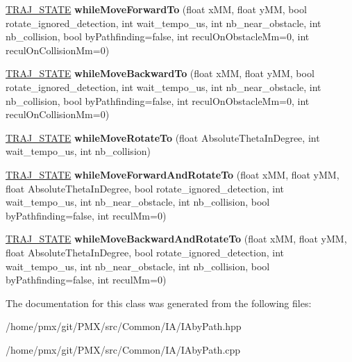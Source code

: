 \begin{DoxyCompactItemize}
\item 
\mbox{\label{classIAbyPath_a835177193bbd053e7901405bbd486401}} 
\hyperlink{path__manager_8h_adb3360abeb29758da93865c8afcb80eb}{T\+R\+A\+J\+\_\+\+S\+T\+A\+TE} {\bfseries while\+Move\+Forward\+To} (float x\+MM, float y\+MM, bool rotate\+\_\+ignored\+\_\+detection, int wait\+\_\+tempo\+\_\+us, int nb\+\_\+near\+\_\+obstacle, int nb\+\_\+collision, bool by\+Pathfinding=false, int recul\+On\+Obstacle\+Mm=0, int recul\+On\+Collision\+Mm=0)
\item 
\mbox{\label{classIAbyPath_acc586e1ba62ffb7a21087a5ca4d2f131}} 
\hyperlink{path__manager_8h_adb3360abeb29758da93865c8afcb80eb}{T\+R\+A\+J\+\_\+\+S\+T\+A\+TE} {\bfseries while\+Move\+Backward\+To} (float x\+MM, float y\+MM, bool rotate\+\_\+ignored\+\_\+detection, int wait\+\_\+tempo\+\_\+us, int nb\+\_\+near\+\_\+obstacle, int nb\+\_\+collision, bool by\+Pathfinding=false, int recul\+On\+Obstacle\+Mm=0, int recul\+On\+Collision\+Mm=0)
\item 
\mbox{\label{classIAbyPath_a42570f6bc87216c2ac5d028ad596fe02}} 
\hyperlink{path__manager_8h_adb3360abeb29758da93865c8afcb80eb}{T\+R\+A\+J\+\_\+\+S\+T\+A\+TE} {\bfseries while\+Move\+Rotate\+To} (float Absolute\+Theta\+In\+Degree, int wait\+\_\+tempo\+\_\+us, int nb\+\_\+collision)
\item 
\mbox{\label{classIAbyPath_ad4bfc042f043aa802567f05604fb37ad}} 
\hyperlink{path__manager_8h_adb3360abeb29758da93865c8afcb80eb}{T\+R\+A\+J\+\_\+\+S\+T\+A\+TE} {\bfseries while\+Move\+Forward\+And\+Rotate\+To} (float x\+MM, float y\+MM, float Absolute\+Theta\+In\+Degree, bool rotate\+\_\+ignored\+\_\+detection, int wait\+\_\+tempo\+\_\+us, int nb\+\_\+near\+\_\+obstacle, int nb\+\_\+collision, bool by\+Pathfinding=false, int recul\+Mm=0)
\item 
\mbox{\label{classIAbyPath_a9535c82f137778cc6cd4b159fe3d58ea}} 
\hyperlink{path__manager_8h_adb3360abeb29758da93865c8afcb80eb}{T\+R\+A\+J\+\_\+\+S\+T\+A\+TE} {\bfseries while\+Move\+Backward\+And\+Rotate\+To} (float x\+MM, float y\+MM, float Absolute\+Theta\+In\+Degree, bool rotate\+\_\+ignored\+\_\+detection, int wait\+\_\+tempo\+\_\+us, int nb\+\_\+near\+\_\+obstacle, int nb\+\_\+collision, bool by\+Pathfinding=false, int recul\+Mm=0)
\end{DoxyCompactItemize}


The documentation for this class was generated from the following files\+:\begin{DoxyCompactItemize}
\item 
/home/pmx/git/\+P\+M\+X/src/\+Common/\+I\+A/I\+Aby\+Path.\+hpp\item 
/home/pmx/git/\+P\+M\+X/src/\+Common/\+I\+A/I\+Aby\+Path.\+cpp\end{DoxyCompactItemize}
